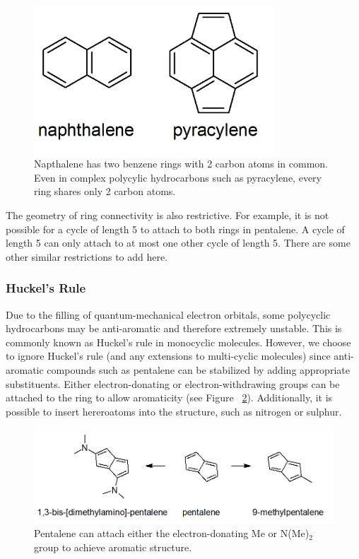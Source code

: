 \documentclass[12pt]{article}
\begin{document}
\begin{figure}[ht!]
\centering
\includegraphics[width=90mm]{polycyclic.png}
\caption{Napthalene has two benzene rings with 2 carbon atoms in common. Even in complex polycylic hydrocarbons such as pyracylene, every ring shares only 2 carbon atoms.}
\label{fig:polycyclic}
\end{figure}

The geometry of ring connectivity is also restrictive. For example, it is not possible for a cycle of length 5 to attach to both rings in pentalene. A cycle of length 5 can only attach to at most one other cycle of length 5. There are some other similar restrictions to add here.

\subsubsection{Huckel's Rule}

Due to the filling of quantum-mechanical electron orbitals, some polycyclic hydrocarbons may be anti-aromatic and therefore extremely unstable. This is commonly known as Huckel's rule in monocyclic molecules. However, we choose to ignore Huckel's rule (and any extensions to multi-cyclic molecules) since anti-aromatic compounds such as pentalene can be stabilized by adding appropriate substituents. Either electron-donating or electron-withdrawing groups can be attached to the ring to allow aromaticity (see Figure ~\ref{fig:pentalene}). Additionally, it is possible to insert hereroatoms into the structure, such as nitrogen or sulphur.

\begin{figure}[ht!]
\centering
\includegraphics[width=160mm]{pentalene.png}
\caption{Pentalene can attach either the electron-donating Me \cite{methylPentalene} or N(Me)$_2$ \cite{nitrogenPentalene} group to achieve aromatic structure.}
\label{fig:pentalene}
\end{figure}
\end{document}

